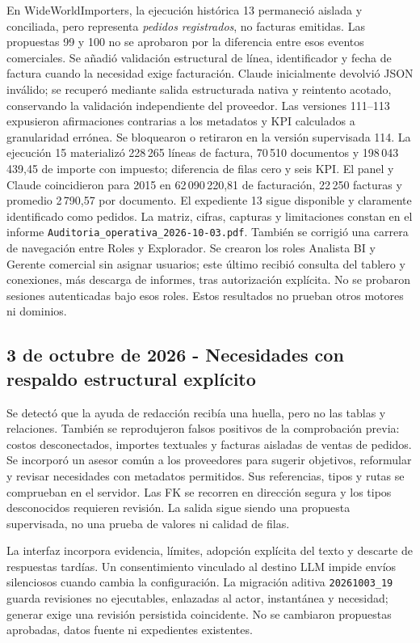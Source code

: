 \documentclass[11pt,letterpaper]{article}
\newcommand{\file}[1]{\texttt{#1}}
\begin{document}
En WideWorldImporters, la ejecución histórica 13 permaneció aislada y conciliada,
pero representa \emph{pedidos registrados}, no facturas emitidas. Las propuestas
99 y 100 no se aprobaron por la diferencia entre esos eventos comerciales. Se
añadió validación estructural de línea, identificador y fecha de factura cuando
la necesidad exige facturación. Claude inicialmente devolvió JSON inválido;
se recuperó mediante salida estructurada nativa y reintento acotado, conservando
la validación independiente del proveedor. Las versiones 111--113 expusieron
afirmaciones contrarias a los metadatos y KPI calculados a granularidad errónea.
Se bloquearon o retiraron en la versión supervisada 114. La ejecución 15
materializó 228\,265 líneas de factura, 70\,510 documentos y
198\,043\,439,45 de importe con impuesto; diferencia de filas cero y seis KPI.
El panel y Claude coincidieron para 2015 en 62\,090\,220,81 de facturación,
22\,250 facturas y promedio 2\,790,57 por documento. El expediente 13 sigue
disponible y claramente identificado como pedidos. La matriz, cifras, capturas
y limitaciones constan en el informe
\file{Auditoria\_operativa\_2026-10-03.pdf}. También se corrigió una
carrera de navegación entre Roles y Explorador. Se crearon los roles Analista
BI y Gerente comercial sin asignar usuarios; este último recibió consulta del
tablero y conexiones, más descarga de informes, tras autorización explícita.
No se probaron sesiones autenticadas bajo esos roles. Estos resultados no
prueban otros motores ni dominios.

\subsection{3 de octubre de 2026 - Necesidades con respaldo estructural explícito}

Se detectó que la ayuda de redacción recibía una huella, pero no las tablas y
relaciones. También se reprodujeron falsos positivos de la comprobación previa:
costos desconectados, importes textuales y facturas aisladas de ventas de pedidos.
Se incorporó un asesor común a los proveedores para sugerir objetivos, reformular
y revisar necesidades con metadatos permitidos. Sus referencias, tipos y rutas
se comprueban en el servidor. Las FK se recorren en dirección segura y los tipos
desconocidos requieren revisión. La salida sigue siendo una propuesta supervisada,
no una prueba de valores ni calidad de filas.

La interfaz incorpora evidencia, límites, adopción explícita del texto y descarte
de respuestas tardías. Un consentimiento vinculado al destino LLM impide envíos
silenciosos cuando cambia la configuración. La migración aditiva
\file{20261003\_19} guarda revisiones no ejecutables, enlazadas al actor, instantánea
y necesidad; generar exige una revisión persistida coincidente. No se cambiaron
propuestas aprobadas, datos fuente ni expedientes existentes.
\end{document}
